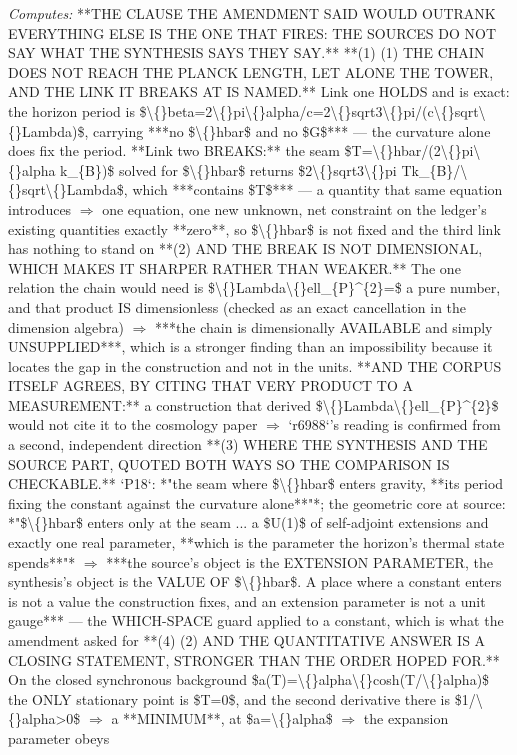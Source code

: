 \begin{description}
\emph{Computes:} **THE CLAUSE THE AMENDMENT SAID WOULD OUTRANK EVERYTHING ELSE IS THE ONE THAT FIRES: THE SOURCES DO NOT SAY WHAT THE SYNTHESIS SAYS THEY SAY.**  **(1) (1) THE CHAIN DOES NOT REACH THE PLANCK LENGTH, LET ALONE THE TOWER, AND THE LINK IT BREAKS AT IS NAMED.** Link one HOLDS and is exact: the horizon period is \$\textbackslash\{\}beta=2\textbackslash\{\}pi\textbackslash\{\}alpha/c=2\textbackslash\{\}sqrt3\textbackslash\{\}pi/(c\textbackslash\{\}sqrt\textbackslash\{\}Lambda)\$, carrying ***no \$\textbackslash\{\}hbar\$ and no \$G\$*** --- the curvature alone does fix the period. **Link two BREAKS:** the seam \$T=\textbackslash\{\}hbar/(2\textbackslash\{\}pi\textbackslash\{\}alpha k\_\{B\})\$ solved for \$\textbackslash\{\}hbar\$ returns \$2\textbackslash\{\}sqrt3\textbackslash\{\}pi Tk\_\{B\}/\textbackslash\{\}sqrt\textbackslash\{\}Lambda\$, which ***contains \$T\$*** --- a quantity that same equation introduces \ensuremath{\Rightarrow} one equation, one new unknown, net constraint on the ledger's existing quantities exactly **zero**, so \$\textbackslash\{\}hbar\$ is not fixed and the third link has nothing to stand on  **(2) AND THE BREAK IS NOT DIMENSIONAL, WHICH MAKES IT SHARPER RATHER THAN WEAKER.** The one relation the chain would need is \$\textbackslash\{\}Lambda\textbackslash\{\}ell\_\{P\}\textasciicircum{}\{2\}=\$ a pure number, and that product IS dimensionless (checked as an exact cancellation in the dimension algebra) \ensuremath{\Rightarrow} ***the chain is dimensionally AVAILABLE and simply UNSUPPLIED***, which is a stronger finding than an impossibility because it locates the gap in the construction and not in the units.  **AND THE CORPUS ITSELF AGREES, BY CITING THAT VERY PRODUCT TO A MEASUREMENT:** a construction that derived \$\textbackslash\{\}Lambda\textbackslash\{\}ell\_\{P\}\textasciicircum{}\{2\}\$ would not cite it to the cosmology paper \ensuremath{\Rightarrow} `r6988`'s reading is confirmed from a second, independent direction  **(3)  WHERE THE SYNTHESIS AND THE SOURCE PART, QUOTED BOTH WAYS SO THE COMPARISON IS CHECKABLE.** `P18`: *"the seam where \$\textbackslash\{\}hbar\$ enters gravity, **its period fixing the constant against the curvature alone**"*; the geometric core at source: *"\$\textbackslash\{\}hbar\$ enters only at the seam ... a \$U(1)\$ of self-adjoint extensions and exactly one real parameter, **which is the parameter the horizon's thermal state spends**"* \ensuremath{\Rightarrow} ***the source's object is the EXTENSION PARAMETER, the synthesis's object is the VALUE OF \$\textbackslash\{\}hbar\$.  A place where a constant enters is not a value the construction fixes, and an extension parameter is not a unit gauge*** --- the WHICH-SPACE guard applied to a constant, which is what the amendment asked for  **(4)  (2) AND THE QUANTITATIVE ANSWER IS A CLOSING STATEMENT, STRONGER THAN THE ORDER HOPED FOR.** On the closed synchronous background \$a(T)=\textbackslash\{\}alpha\textbackslash\{\}cosh(T/\textbackslash\{\}alpha)\$ the ONLY stationary point is \$T=0\$, and the second derivative there is \$1/\textbackslash\{\}alpha>0\$ \ensuremath{\Rightarrow} a **MINIMUM**, at \$a=\textbackslash\{\}alpha\$ \ensuremath{\Rightarrow} the expansion parameter obeys 
\end{description}
